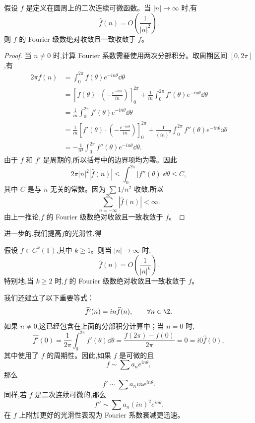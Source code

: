 \begin{corollary}\label{f(n)=O(1/n2)}
	假设 $f$ 是定义在圆周上的二次连续可微函数。当 $|n|\to\infty$ 时,有
	\[
	\widehat f(n)=O\left(\frac1{|n|^2}\right).
	\]
	则 $f$ 的 Fourier 级数绝对收敛且一致收敛于 $f$。
\end{corollary}

\begin{proof}
	当 $n\neq0$ 时,计算 Fourier 系数需要使用两次分部积分。取周期区间 $[0,2\pi]$,有
	\[
	\begin{aligned}
		2\pi\widehat f(n)
		&=\int_0^{2\pi}f(\theta)e^{-in\theta}\dd\theta                                      \\
		&=\left[f(\theta)\cdot \left(-\frac{e^{-in\theta}}{in}\right)\right]_0^{2\pi}
		+\frac1{in}\int_0^{2\pi}f'(\theta)e^{-in\theta}\dd\theta                              \\
		&=\frac1{in}\int_0^{2\pi}f'(\theta)e^{-in\theta}\dd\theta                              \\
		&=\frac1{in}\left[f'(\theta)\cdot\left(-\frac{e^{-in\theta}}{in}\right)\right]_0^{2\pi}
		+\frac1{(in)^2}\int_0^{2\pi}f''(\theta)e^{-in\theta}\dd\theta                          \\
		&=-\frac1{n^2}\int_0^{2\pi}f''(\theta)e^{-in\theta}\dd\theta.
	\end{aligned}
	\]
	由于 $f$ 和 $f'$ 是周期的,所以括号中的边界项均为零。因此
	\[
	2\pi |n|^2|\widehat f(n)|
	\leq \int_0^{2\pi}|f''(\theta)|\dd\theta
	\leq C,
	\]
	其中 $C$ 是与 $n$ 无关的常数。因为 $\sum 1/n^2$ 收敛,所以
	\[
	\sum_{n=-\infty}^{\infty}|\widehat f(n)|<\infty.
	\]
	由上一推论,$f$ 的 Fourier 级数绝对收敛且一致收敛于 $f$。
\end{proof}
进一步的,我们提高$f$的光滑性,得
\begin{corollary}\label{f(n)=O(1/n^k)}
	假设 $f\in C^k(\mathbb T)$,其中 $k\geq 1$。则当 $|n|\to\infty$ 时,
	\[
	\widehat f(n)=O\left(\frac1{|n|^k}\right).
	\]
	特别地,当 $k\geq 2$ 时,$f$ 的 Fourier 级数绝对收敛且一致收敛于 $f$。
\end{corollary}

我们还建立了以下重要等式：
\[
\widehat{f'}(n)=in\widehat f(n),
\qquad \forall n\in\Z.
\]
如果 $n\neq0$,这已经包含在上面的分部积分计算中；当 $n=0$ 时,
\[
\widehat{f'}(0)
=\frac1{2\pi}\int_0^{2\pi}f'(\theta)\dd\theta
=\frac{f(2\pi)-f(0)}{2\pi}=0=i0\widehat f(0),
\]
其中使用了 $f$ 的周期性。因此,如果 $f$ 是可微的且
\[
f\sim\sum a_ne^{in\theta},
\]
那么
\[
f'\sim\sum a_n in e^{in\theta}.
\]
同样,若 $f$ 是二次连续可微的,那么
\[
f''\sim\sum a_n(in)^2e^{in\theta}.
\]
在 $f$ 上附加更好的光滑性表现为 Fourier 系数衰减更迅速。
